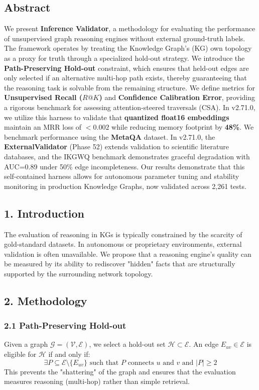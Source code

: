 
\subsection*{Abstract}
We present \textbf{Inference Validator}, a methodology for evaluating the performance of unsupervised graph reasoning engines without external ground-truth labels. The framework operates by treating the Knowledge Graph's (KG) own topology as a proxy for truth through a specialized hold-out strategy. We introduce the \textbf{Path-Preserving Hold-out} constraint, which ensures that held-out edges are only selected if an alternative multi-hop path exists, thereby guaranteeing that the reasoning task is solvable from the remaining structure. We define metrics for \textbf{Unsupervised Recall ($R@K$)} and \textbf{Confidence Calibration Error}, providing a rigorous benchmark for assessing attention-steered traversals (CSA). In v2.71.0, we utilize this harness to validate that \textbf{quantized float16 embeddings} maintain an MRR loss of $< 0.002$ while reducing memory footprint by \textbf{48\%}. We benchmark performance using the \textbf{MetaQA} \cite{metaqa2017} dataset. In v2.71.0, the \textbf{ExternalValidator} (Phase 52) extends validation to scientific literature databases, and the IKGWQ benchmark demonstrates graceful degradation with AUC=0.89 under 50\% edge incompleteness. Our results demonstrate that this self-contained harness allows for autonomous parameter tuning and stability monitoring in production Knowledge Graphs, now validated across 2,261 tests.

\subsection*{1. Introduction}
The evaluation of reasoning in KGs is typically constrained by the scarcity of gold-standard datasets. In autonomous or proprietary environments, external validation is often unavailable. We propose that a reasoning engine's quality can be measured by its ability to rediscover "hidden" facts that are structurally supported by the surrounding network topology.

\subsection*{2. Methodology}

\subsubsection*{2.1 Path-Preserving Hold-out}
Given a graph $\mathcal{G} = (\mathcal{V}, \mathcal{E})$, we select a hold-out set $\mathcal{H} \subset \mathcal{E}$. An edge $E_{uv} \in \mathcal{E}$ is eligible for $\mathcal{H}$ if and only if:
$$\exists P \subseteq \mathcal{E} \setminus \{E_{uv}\} \text{ such that } P \text{ connects } u \text{ and } v \text{ and } |P| \geq 2$$
This prevents the "shattering" of the graph and ensures that the evaluation measures reasoning (multi-hop) rather than simple retrieval.

